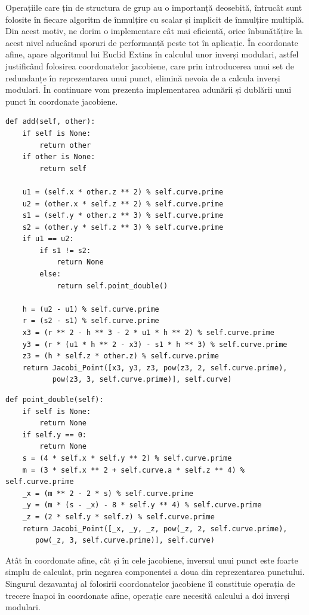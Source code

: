 Operațiile care țin de structura de grup au o importanță deosebită, întrucât sunt folosite în fiecare algoritm de înmulțire cu scalar și implicit de înmulțire multiplă. Din acest motiv, ne dorim o implementare cât mai eficientă, orice înbunătățire la acest nivel aducând sporuri de performanță peste tot în aplicație. În coordonate afine, apare algoritmul lui Euclid Extins în calculul unor inverși modulari, astfel justificând folosirea coordonatelor jacobiene, care prin introducerea unui set de redundanțe în reprezentarea unui punct, elimină nevoia de a calcula inverși modulari. În continuare vom prezenta implementarea adunării și dublării unui punct în coordonate jacobiene. 

\begin{lstlisting}
def add(self, other):
    if self is None:
        return other
    if other is None:
        return self

    u1 = (self.x * other.z ** 2) % self.curve.prime
    u2 = (other.x * self.z ** 2) % self.curve.prime
    s1 = (self.y * other.z ** 3) % self.curve.prime
    s2 = (other.y * self.z ** 3) % self.curve.prime
    if u1 == u2:
        if s1 != s2:
            return None
        else:
            return self.point_double()

    h = (u2 - u1) % self.curve.prime
    r = (s2 - s1) % self.curve.prime
    x3 = (r ** 2 - h ** 3 - 2 * u1 * h ** 2) % self.curve.prime
    y3 = (r * (u1 * h ** 2 - x3) - s1 * h ** 3) % self.curve.prime
    z3 = (h * self.z * other.z) % self.curve.prime
    return Jacobi_Point([x3, y3, z3, pow(z3, 2, self.curve.prime), 
           pow(z3, 3, self.curve.prime)], self.curve)
\end{lstlisting}

\begin{lstlisting}
def point_double(self):
    if self is None:
        return None
    if self.y == 0:
        return None
    s = (4 * self.x * self.y ** 2) % self.curve.prime
    m = (3 * self.x ** 2 + self.curve.a * self.z ** 4) % self.curve.prime
    _x = (m ** 2 - 2 * s) % self.curve.prime
    _y = (m * (s - _x) - 8 * self.y ** 4) % self.curve.prime
    _z = (2 * self.y * self.z) % self.curve.prime
    return Jacobi_Point([_x, _y, _z, pow(_z, 2, self.curve.prime), 
	   pow(_z, 3, self.curve.prime)], self.curve)
\end{lstlisting}

Atât în coordonate afine, cât și în cele jacobiene, inversul unui punct este foarte simplu de calculat, prin negarea componentei a doua din reprezentarea punctului. Singurul dezavantaj al folosirii coordonatelor jacobiene îl constituie operația de trecere înapoi în coordonate afine, operație care necesită calcului a doi inverși modulari.

